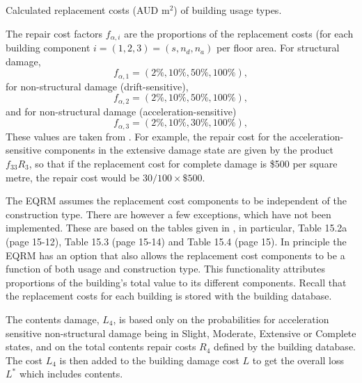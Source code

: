 \begin{table}[p]
\centering \caption{Calculated replacement costs (AUD
$\mathrm{m^2}$) of building
  usage types.}
  \vspace{0.8em}
\label{tab:replace_costs} \small

\end{table}


The repair cost factors $f_{\alpha, i}$
are the proportions of the replacement costs (for each building
component $i=(1,2,3)=(s, n_d, n_a)$  per floor area.
For structural damage,
\begin{equation}
 f_{\alpha, 1} = (2\%, 10\%, 50\%, 100\%),
\end{equation}
for non-structural damage (drift-sensitive),
\begin{equation}
 f_{\alpha, 2} = (2\%, 10\%, 50\%, 100\%),
\end{equation}
and for non-structural damage (acceleration-sensitive)
\begin{equation}
 f_{\alpha, 3} = (2\%, 10\%, 30\%, 100\%),
\end{equation}
These values are taken from \cite{dr_FEMA99b}. For example, the
repair cost for the acceleration-sensitive components in the
extensive damage state are given by the product $f_{33}R_3$, so
that if the replacement cost for complete damage is \$500 per
square metre, the repair cost would be $30/100\times\$500$.


The EQRM assumes the replacement cost components to be
independent of the construction type. There are however a few exceptions,
which have not been implemented. These are based on the tables
given in \cite{dr_FEMA99b}, in particular, Table 15.2a (page
15-12), Table 15.3 (page 15-14) and Table 15.4 (page 15). In
principle the EQRM has an option that also allows the replacement
cost components to be a function of both usage and construction
type. This functionality
attributes proportions of the building's total value to its
different components. Recall that the replacement costs for
each building is stored with the building database.

The contents damage, $L_4$, is based only on the probabilities for
acceleration sensitive non-structural damage being in Slight,
Moderate, Extensive or Complete states, and on the total contents
repair costs $R_4$ defined by the building database. The cost $L_4$
is then added to the building damage cost $L$ to get the overall
loss $L^*$ which includes contents.

